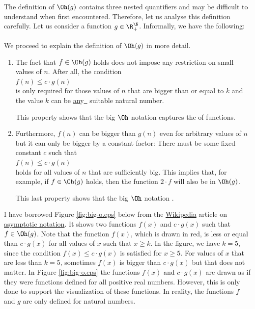 The definition of $\Oh(g)$ contains three nested quantifiers and may be difficult to understand
when first encountered.  Therefore, let us analyse this definition carefully.  Let us consider a
function $g \in \R_+^\N$.  Informally, we have the following:
\\[0.2cm]
\hspace*{1.3cm}
\colorbox{red}{}
\\[0.2cm]
We proceed to explain the definition of $\Oh(g)$ in more detail.
\begin{enumerate}
\item The fact that $f \in \Oh(g)$ holds does not impose any restriction on small values of $n$.
      After all, the condition
      \\[0.2cm]
      \hspace*{1.3cm}
      $f(n) \leq c \cdot g(n)$
      \\[0.2cm]
      is only required for those values of $n$ that are bigger than or equal to $k$ and the value
      $k$ can be \underline{an}y\hspace*{-0.1cm}\underline{\ } suitable natural number.

      This property shows that the big $\Oh$ notation captures the  of functions.
\item Furthermore, $f(n)$ can be bigger than $g(n)$ even for arbitrary values of $n$ 
      but it can only be bigger by a constant factor:  There must be some fixed constant $c$
      such that 
      \\[0.2cm]
      \hspace*{1.3cm}
      $f(n) \leq c \cdot g(n)$
      \\[0.2cm]
      holds for all values of $n$ that are sufficiently big.  This implies that, for example, if $f \in \Oh(g)$
      holds, then the function $2 \cdot f$ will also be in $\Oh(g)$.

      This last property shows that the big $\Oh$ notation .
\end{enumerate}
I have borrowed Figure \ref{fig:big-o.eps} below from the \href{http://www.wikipedia.org}{Wikipedia} article on 
\href{http://en.wikipedia.org/wiki/Asymptotic_notation}{asymptotic notation}.  It shows two functions 
$f(x)$ and $c \cdot g(x)$ such that $f \in \Oh(g)$.  Note that the function $f(x)$, which is drawn
in red, is less or equal than $c \cdot g(x)$ for all values of $x$ such that $x \geq k$.  In the
figure, we have $k=5$, since the condition $f(x) \leq c \cdot g(x)$ is satisfied for $x \geq 5$. For
values of $x$ that are less than $k = 5$, sometimes $f(x)$ is bigger than $c \cdot g(x)$ but that does
not matter.  In Figure \ref{fig:big-o.eps} the functions $f(x)$ and $c \cdot g(x)$ are drawn as if they were
functions defined for all positive real numbers.  However, this is only done to support the
visualization of these functions.  In reality, the functions $f$ and $g$ are only defined for
natural numbers.



